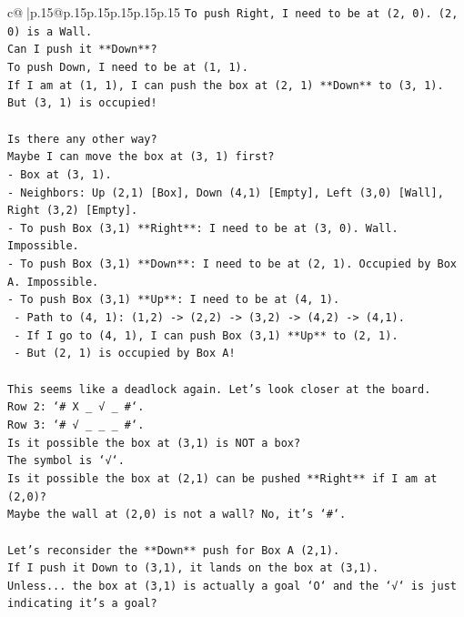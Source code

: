 \documentclass{article}
\begin{document}
{\begin{supertabular}{c@{$\;$}|p{.15\linewidth}@{}p{.15\linewidth}p{.15\linewidth}p{.15\linewidth}p{.15\linewidth}p{.15\linewidth}}
{{{\texttt{To push Right, I need to be at (2, 0). (2, 0) is a Wall.} \\
\texttt{Can I push it **Down**?} \\
\texttt{To push Down, I need to be at (1, 1).} \\
\texttt{If I am at (1, 1), I can push the box at (2, 1) **Down** to (3, 1).} \\
\texttt{But (3, 1) is occupied!} \\
\\ 
\texttt{Is there any other way?} \\
\texttt{Maybe I can move the box at (3, 1) first?} \\
\texttt{{-} Box at (3, 1).} \\
\texttt{{-} Neighbors: Up (2,1) {[}Box{]}, Down (4,1) {[}Empty{]}, Left (3,0) {[}Wall{]}, Right (3,2) {[}Empty{]}.} \\
\texttt{{-} To push Box (3,1) **Right**: I need to be at (3, 0). Wall. Impossible.} \\
\texttt{{-} To push Box (3,1) **Down**: I need to be at (2, 1). Occupied by Box A. Impossible.} \\
\texttt{{-} To push Box (3,1) **Up**: I need to be at (4, 1).} \\
\texttt{  {-} Path to (4, 1): (1,2) {-}> (2,2) {-}> (3,2) {-}> (4,2) {-}> (4,1).} \\
\texttt{  {-} If I go to (4, 1), I can push Box (3,1) **Up** to (2, 1).} \\
\texttt{  {-} But (2, 1) is occupied by Box A!} \\
\\ 
\texttt{This seems like a deadlock again. Let's look closer at the board.} \\
\texttt{Row 2: `\# X \_ √ \_ \#`.} \\
\texttt{Row 3: `\# √ \_ \_ \_ \#`.} \\
\texttt{Is it possible the box at (3,1) is NOT a box?} \\
\texttt{The symbol is `√`.} \\
\texttt{Is it possible the box at (2,1) can be pushed **Right** if I am at (2,0)?} \\
\texttt{Maybe the wall at (2,0) is not a wall? No, it's `\#`.} \\
\\ 
\texttt{Let's reconsider the **Down** push for Box A (2,1).} \\
\texttt{If I push it Down to (3,1), it lands on the box at (3,1).} \\
\texttt{Unless... the box at (3,1) is actually a goal `O` and the `√` is just indicating it's a goal?} \\
}}}
\end{supertabular}}
\end{document}
